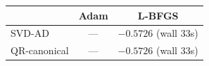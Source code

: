 \begin{tabular}{lcc}
\toprule
& Adam & L-BFGS \\
\midrule
SVD-AD       & --- & $-0.5726$  (wall 33s) \\
QR-canonical & --- & $-0.5726$  (wall 33s) \\
\bottomrule
\end{tabular}
